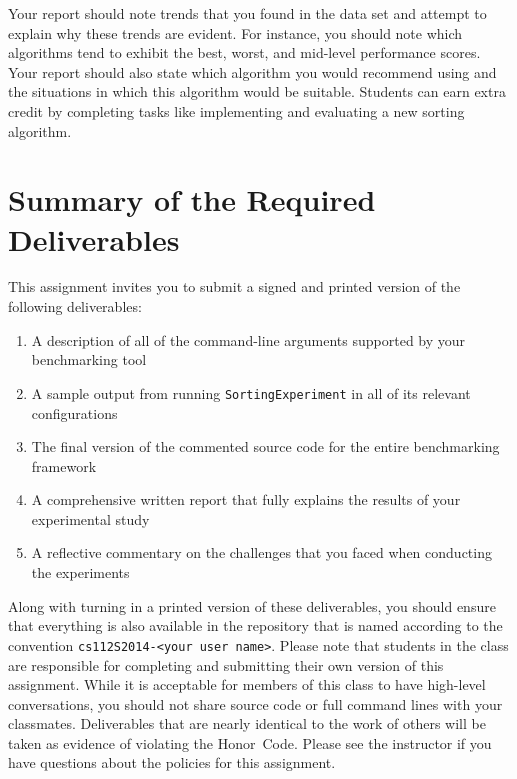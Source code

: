 Your report should note trends that you found in the data set and attempt to explain why these trends are evident.  For
instance, you should note which algorithms tend to exhibit the best, worst, and mid-level performance scores.  Your
report should also state which algorithm you would recommend using and the situations in which this algorithm would be
suitable. Students can earn extra credit by completing tasks like implementing and evaluating a new sorting algorithm.

\section*{Summary of the Required Deliverables}

  This assignment invites you to submit a signed and printed version of the following deliverables: 

  \begin{enumerate} 
  \itemsep0pt
  \item A description of all of the command-line arguments supported by your benchmarking tool 

  \item A sample output from running {\tt SortingExperiment} in all of its relevant configurations

  \item The final version of the commented source code for the entire benchmarking framework 

  \item A comprehensive written report that fully explains the results of your experimental study

  \item A reflective commentary on the challenges that you faced when conducting the experiments
   
  \end{enumerate}

  Along with turning in a printed version of these deliverables, you should ensure that everything is also available in
  the repository that is named according to the convention {\tt cs112S2014-<your user name>}. Please note that students
  in the class are responsible for completing and submitting their own version of this assignment.    While it is
  acceptable for members of this class to have high-level conversations, you should not share source code or full
  command lines with your classmates.  Deliverables that are nearly identical to the work of others will be taken as
  evidence of violating the \mbox{Honor Code}.  Please see the instructor if you have questions about the policies for
  this assignment.

  
